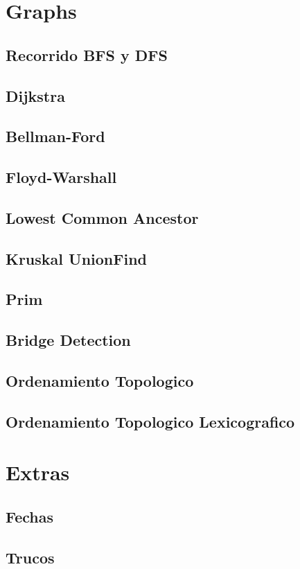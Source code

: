 \section{Graphs}
\subsection{Recorrido BFS y DFS}
\raggedbottom
\hrulefill
\subsection{Dijkstra}
\raggedbottom
\hrulefill
\subsection{Bellman-Ford}
\raggedbottom
\hrulefill
\subsection{Floyd-Warshall}
\raggedbottom
\hrulefill
\subsection{Lowest Common Ancestor}
\raggedbottom
\hrulefill
\subsection{Kruskal UnionFind}
\raggedbottom
\hrulefill
\subsection{Prim}
\raggedbottom
\hrulefill
\subsection{Bridge Detection}
\raggedbottom
\hrulefill
\subsection{Ordenamiento Topologico}
\raggedbottom
\hrulefill
\subsection{Ordenamiento Topologico Lexicografico}
\raggedbottom
\hrulefill
\newpage

\section{Extras}
\subsection{Fechas}
\raggedbottom
\hrulefill
\subsection{Trucos}
\raggedbottom
\hrulefill
\newpage

